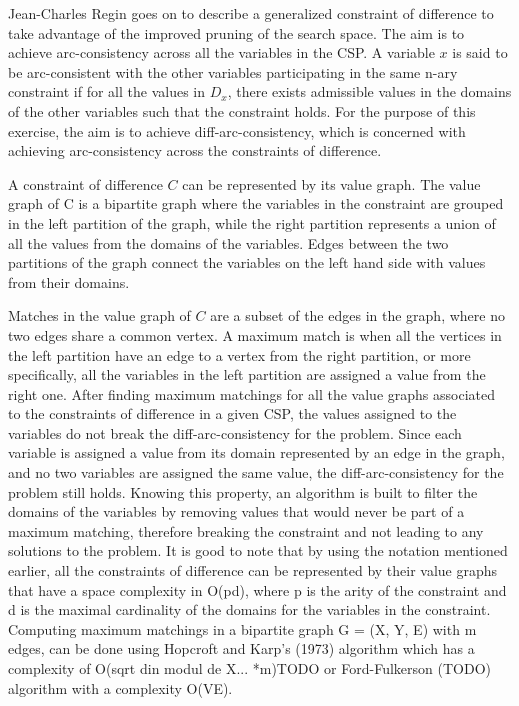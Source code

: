 \documentclass{l4proj}
\begin{document}
\noindent Jean-Charles Regin goes on to describe a generalized constraint of difference to take advantage of the improved pruning of the search space. The aim is to achieve arc-consistency across all the variables in the CSP. A variable $x$ is said to be arc-consistent with the other variables participating in the same n-ary constraint if for all the values in $D_x$, there exists admissible values in the domains of the other variables such that the constraint holds. For the purpose of this exercise, the aim is to achieve diff-arc-consistency, which is concerned with achieving arc-consistency across the constraints of difference.

\noindent A constraint of difference $C$ can be represented by its value graph. The value graph of C is a bipartite graph where the variables in the constraint are grouped in the left partition of the graph, while the right partition represents a union of all the values from the domains of the variables. Edges between the two partitions of the graph connect the variables on the left hand side with values from their domains.

\noindent Matches in the value graph of $C$ are a subset of the edges in the graph, where no two edges share a common vertex. A maximum match is when all the vertices in the left partition have an edge to a vertex from the right partition, or more specifically, all the variables in the left partition are assigned a value from the right one.
After finding maximum matchings for all the value graphs associated to the constraints of difference in a given CSP, the values assigned to the variables do not break the diff-arc-consistency for the problem. Since each variable is assigned a value from its domain represented by an edge in the graph, and no two variables are assigned the same value, the diff-arc-consistency for the problem still holds. Knowing this property, an algorithm is built to filter the domains of the variables by removing values that would never be part of a maximum matching, therefore breaking the constraint and not leading to any solutions to the problem. It is good to note that by using the notation mentioned earlier, all the constraints of difference can be represented by their value graphs that have a space complexity in O(pd), where p is the arity of the constraint and d is the maximal cardinality of the domains for the variables in the constraint. Computing maximum matchings in a bipartite graph G = (X, Y, E) with m edges, can be done using Hopcroft and Karp’s (1973) algorithm which has a complexity of O(sqrt din modul de X... *m)TODO or Ford-Fulkerson (TODO) algorithm with a complexity O(VE). 
\end{document}
